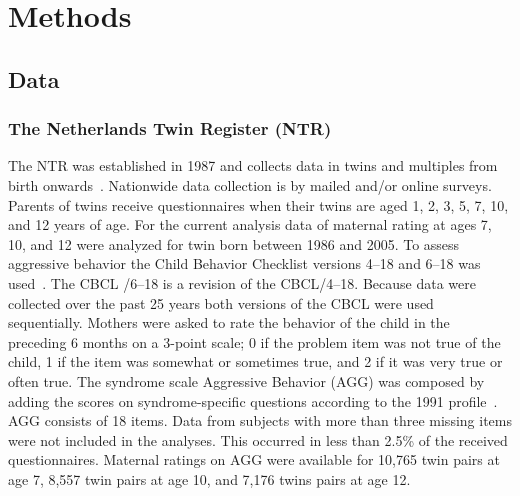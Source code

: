 ﻿\section{Methods}
\subsection{Data}
\subsubsection{The Netherlands Twin Register (NTR)}
The NTR was established in 1987 and collects data in twins and multiples from birth onwards~\cite{Willemsen2013a}.
Nationwide data collection is by mailed and/or online surveys.
Parents of twins receive questionnaires when their twins are aged 1, 2, 3, 5, 7, 10, and 12 years of age.
For the current analysis data of maternal rating at ages 7, 10, and 12 were analyzed for twin born between 1986 and 2005.
To assess aggressive behavior the Child Behavior Checklist versions 4--18 and 6--18 was used~\cite{Achenbach2003}.
The CBCL /6--18 is a revision of the CBCL/4--18.
Because data were collected over the past 25 years both versions of the CBCL were used sequentially.
Mothers were asked to rate the behavior of the child in the preceding 6 months on a 3-point scale; 0 if the problem item was not true of the child, 1 if the item was somewhat or sometimes true, and 2 if it was very true or often true.
The syndrome scale Aggressive Behavior (AGG) was composed by adding the scores on syndrome-specific questions according to the 1991 profile~\cite{Achenbach2003}.
AGG consists of 18 items.
Data from subjects with more than three missing items were not included in the analyses.
This occurred in less than 2.5\% of the received questionnaires.  Maternal ratings on AGG were available for 10,765 twin pairs at age 7, 8,557 twin pairs at age 10, and 7,176 twins pairs at age 12.

